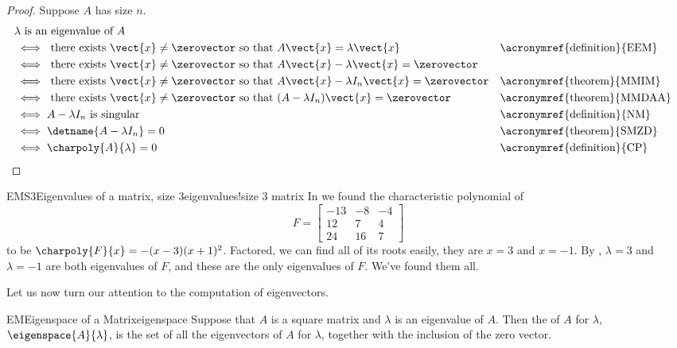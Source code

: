 %
\begin{proof}
%
Suppose $A$ has size $n$.
%
\begin{align*}
&\text{$\lambda$ is an eigenvalue of $A$}\\
%
&\iff\text{ there exists $\vect{x}\neq\zerovector$ so that $A\vect{x}=\lambda\vect{x}$}
&&\text{\acronymref{definition}{EEM}}\\
%
&\iff \text{ there exists $\vect{x}\neq\zerovector$ so that $A\vect{x}-\lambda\vect{x}=\zerovector$}\\
%
&\iff \text{ there exists $\vect{x}\neq\zerovector$ so that $A\vect{x}-\lambda I_n\vect{x}=\zerovector$}
&&\text{\acronymref{theorem}{MMIM}}\\
%
&\iff\text{ there exists $\vect{x}\neq\zerovector$ so that $(A-\lambda I_n)\vect{x}=\zerovector$}
&&\text{\acronymref{theorem}{MMDAA}}\\
%
&\iff A-\lambda I_n\text{ is singular}
&&\text{\acronymref{definition}{NM}}\\
%
&\iff\detname{A-\lambda I_n}=0
&&\text{\acronymref{theorem}{SMZD}}\\
%
&\iff\charpoly{A}{\lambda}=0
&&\text{\acronymref{definition}{CP}}
%
\end{align*}
%
\end{proof}
%
\begin{example}{EMS3}{Eigenvalues of a matrix, size 3}{eigenvalues!size 3 matrix}
In  we found the characteristic polynomial of 
%
\begin{equation*}
F=
\begin{bmatrix}
-13 & -8 & -4\\ 
12 & 7 & 4\\ 
24 & 16 & 7
\end{bmatrix}
\end{equation*}
%
to be  $\charpoly{F}{x}=-(x-3)(x+1)^2$.  Factored, we can find all of its roots easily, they are $x=3$ and $x=-1$.  By , $\lambda=3$ and $\lambda=-1$ are both eigenvalues of $F$, and these are the only eigenvalues of $F$.  We've found them all.
%
\end{example}
%
Let us now turn our attention to the computation of eigenvectors.
%
\begin{definition}{EM}{Eigenspace of a Matrix}{eigenspace}
Suppose that $A$ is a square matrix and $\lambda$ is an eigenvalue of $A$.  Then the  of $A$ for $\lambda$, $\eigenspace{A}{\lambda}$, is the set of all the eigenvectors of $A$ for $\lambda$, together with the inclusion of the zero vector.
\end{definition}
